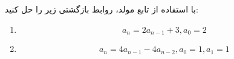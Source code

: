 \EXERCISE
با استفاده از تابع مولد، روابط بازگشتی زیر را حل کنید:
\begin{enumerate}
\item
$$a_n = 2a_{n-1} + 3, a_0 = 2$$
\item
$$a_n = 4a_{n-1} - 4a_{n-2}, a_0 = 1, a_1 = 1$$
\end{enumerate}